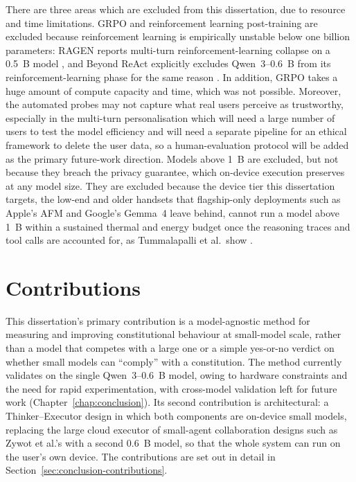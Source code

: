 There are three areas which are excluded from this dissertation, due to resource and time limitations. GRPO and reinforcement learning post-training are excluded because reinforcement learning is empirically unstable below one billion parameters: RAGEN reports multi-turn reinforcement-learning collapse on a 0.5~B model \cite{wang2025ragenunderstandingselfevolutionllm}, and Beyond ReAct explicitly excludes Qwen~3--0.6~B from its reinforcement-learning phase for the same reason \cite{wei2025reactplannercentricframeworkcomplex}. In addition, GRPO takes a huge amount of compute capacity and time, which was not possible. Moreover, the automated probes may not capture what real users perceive as trustworthy, especially in the multi-turn personalisation which will need a large number of users to test the model efficiency and will need a separate pipeline for an ethical framework to delete the user data, so a human-evaluation protocol will be added as the primary future-work direction. Models above 1~B are excluded, but not because they breach the privacy guarantee, which on-device execution preserves at any model size. They are excluded because the device tier this dissertation targets, the low-end and older handsets that flagship-only deployments such as Apple's AFM and Google's Gemma~4 leave behind, cannot run a model above 1~B within a sustained thermal and energy budget once the reasoning traces and tool calls are accounted for, as Tummalapalli et al.\ show \cite{tummalapalli2026llminferenceedgemobile}.

\section{Contributions}
\label{sec:contributions}

This dissertation's primary contribution is a model-agnostic method for measuring and improving constitutional behaviour at small-model scale, rather than a model that competes with a large one or a simple yes-or-no verdict on whether small models can ``comply'' with a constitution. The method currently validates on the single Qwen~3--0.6~B model, owing to hardware constraints and the need for rapid experimentation, with cross-model validation left for future work (Chapter~\ref{chap:conclusion}). Its second contribution is architectural: a Thinker--Executor design in which both components are on-device small models, replacing the large cloud executor of small-agent collaboration designs such as Zywot et al.'s \cite{zywot2026smallagentscollaboratebeat} with a second 0.6~B model, so that the whole system can run on the user's own device. The contributions are set out in detail in Section~\ref{sec:conclusion-contributions}.


